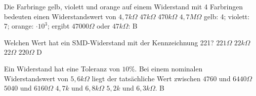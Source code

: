 
{Die Farbringe gelb, violett und orange auf einem Widerstand mit 4 Farbringen bedeuten einen Widerstandswert von}%
{$4,7k\Omega$}%
{$47k\Omega$}%
{$470k\Omega$}%
{$4,7M\Omega$}%
{gelb: 4; violett: 7; orange: $\cdot 10^3$; ergibt $47000\Omega$ oder $47k\Omega$: B}%

{Welchen Wert hat ein SMD-Widerstand mit der Kennzeichnung 221?}%
{$221\Omega$}%
{$22k\Omega$}%
{$22\Omega$}%
{$220\Omega$}%
{D}%

{Ein Widerstand hat eine Toleranz von $10 \%$. Bei einem nominalen Widerstandswert von $5,6 k\Omega$ liegt der tatsächliche Wert zwischen}%
{$4760$ und $6440 \Omega$}%
{$5040$ und $6160 \Omega$}%
{$4,7 k$ und $6,8 k\Omega$}%
{$5,2 k$ und $6,3 k\Omega.$}%
{B}%


